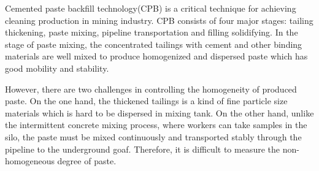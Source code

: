 \documentclass[pdflatex,sn-mathphys]{sn-jnl}%
\theoremstyle{thmstyleone}%
\theoremstyle{thmstyletwo}%
\theoremstyle{thmstylethree}%
\begin{document}
Cemented paste backfill technology(CPB) is a critical technique for achieving cleaning production in mining industry.  
CPB consists of four major stages: tailing thickening, paste mixing, pipeline transportation and filling solidifying\cite{YIN2020119590}. 
In the stage of paste mixing, the concentrated tailings with cement and other binding materials are well mixed to produce homogenized and dispersed paste which has good mobility and stability\cite{YIN2022e01525,su14052758}. 

However, there are two challenges in controlling the homogeneity of produced paste.
On the one hand, the thickened tailings is a kind of fine particle size materials which is hard to be dispersed in mixing tank\cite{IJM-12-2021-1162}.         
On the other hand, unlike the intermittent concrete mixing process\cite{VisionHomoReviewer}, where workers can take samples in the silo, the paste must be mixed continuously and transported stably through the pipeline to the underground goaf. Therefore, it is difficult to measure the non-homogeneous degree of paste\cite{CJoE-rheology}.            
\end{document}
